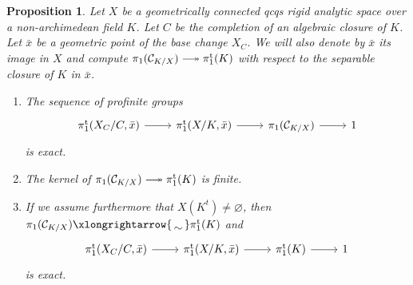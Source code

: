 \documentclass[a4paper,twoside,11pt,reqno]{amsart}
\newcommand{\cC}{{\mathcal C}}
\DeclareRobustCommand\longtwoheadrightarrow {\relbar\joinrel\twoheadrightarrow}
\newcommand{\surj}{\longtwoheadrightarrow}
\newcommand{\isomto}{\xlongrightarrow{\,\smash{\raisebox{-0.65ex} 
    {\ensuremath{\displaystyle\sim}}}\,}}
\newcommand{\pitame}{\pi_1^{\mathrm{t}}}
\newtheorem{prop}[thm]{Proposition}
\theoremstyle{definition}
\numberwithin{equation}{subsection}
\begin{document}
\begin{prop} 
\label{prop:weak-fundamental-exact-seq}
    Let $X$ be a geometrically connected qcqs rigid analytic space over a non-archimedean field $K$. Let $C$ be the completion of an algebraic closure of $K$.  Let $\bar x$ be a geometric point of the base change $X_C$. We will also denote by $\bar x$ its image in $X$ and compute $\pi_1(\cC_{K/X}) \surj \pitame(K)$ with respect to the separable closure of $K$ in $\bar x$. 
    \begin{enumerate}[ref=(\arabic*)]
        \item 
        \label{propitem:weak-fes ct version}
        The sequence of profinite groups
        \begin{equation}
            \label{eq:homotopy exact sequence ct version}
            \begin{tikzcd}
                \pitame(X_C/C, \bar x)\ar[r] & \pitame(X/K, \bar x) \ar[r] & \pi_1(\cC_{K/X}) \ar[r] & 1           
            \end{tikzcd}
        \end{equation}        
        is exact.
        \item \label{propitem:finite kernel}
        The kernel of $\pi_1(\cC_{K/X}) \surj \pitame(K)$ is finite.
        \item 
        \label{propitem:weak-fes}
        If we assume furthermore that $X(K^t) \not= \varnothing$, then 
        $\pi_1(\cC_{K/X})\isomto \pitame(K)$ and
        \begin{equation}
            \label{eq:homotopy exact sequence}
            \begin{tikzcd}
                \pitame(X_C/C, \bar x)\ar[r] & \pitame(X/K, \bar x) \ar[r] & \pitame(K) \ar[r] & 1   
            \end{tikzcd}
        \end{equation}        
        is exact.
    \end{enumerate}
\end{prop}
\end{document}
